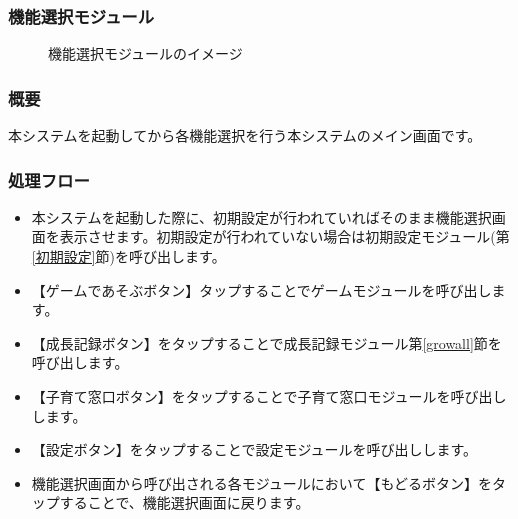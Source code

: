 \documentclass[a4j]{jarticle}
\begin{document}
\subsubsection{機能選択モジュール\label{機能選択}}
\begin{figure}[H]
    \begin{center}
    \caption {機能選択モジュールのイメージ}
    \label{functionselection}
    \end{center}
\end{figure}

\subsubsection*{概要}
本システムを起動してから各機能選択を行う本システムのメイン画面です。

\subsubsection*{処理フロー}
\begin{itemize}
\item 本システムを起動した際に、初期設定が行われていればそのまま機能選択画面を表示させます。初期設定が行われていない場合は初期設定モジュール(第\ref{初期設定}節)を呼び出します。

\item 【ゲームであそぶボタン】タップすることでゲームモジュールを呼び出します。

\item 【成長記録ボタン】をタップすることで成長記録モジュール第\ref{growall}節を呼び出します。

\item 【子育て窓口ボタン】をタップすることで子育て窓口モジュールを呼び出しします。

\item 【設定ボタン】をタップすることで設定モジュールを呼び出しします。

\item 機能選択画面から呼び出される各モジュールにおいて【もどるボタン】をタップすることで、機能選択画面に戻ります。
\end{itemize}
\end{document}
